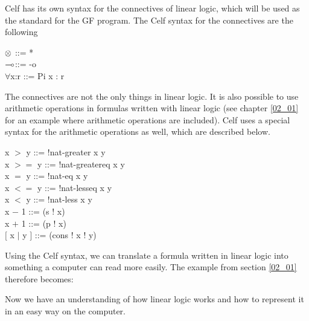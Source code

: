 Celf has its own syntax for the connectives of linear logic, which will be used as the standard for the GF program. The Celf syntax for the connectives are the following
\begin{texto}
	$\otimes$\hspace{40pt} ::= * \\
	$\multimap$\hspace{40pt}::= -o \\
	$\forall$x:r\hspace{30pt} ::= Pi x : r \\
\end{texto}
The connectives are not the only things in linear logic. It is also possible to use arithmetic operations in formulas written with linear logic (see chapter \ref{02_01} for an example where arithmetic operations are included). Celf uses a special syntax for the arithmetic operations as well, which are described below.
\begin{texto}
	x $>$ y\hspace{22.8pt} ::= !nat-greater x y \\
	x $>=$ y\hspace{15pt} ::= !nat-greatereq x y \\
	x $=$ y\hspace{22.8pt} ::= !nat-eq x y \\
	x $<=$ y\hspace{15pt} ::= !nat-lesseq x y \\
	x $<$ y\hspace{22.8pt} ::= !nat-less x y \\
 	x $-$ 1\hspace{22.8pt} ::= (s ! x) \\
 	x $+$ 1\hspace{22.8pt} ::= (p ! x) \\
	$\lbrack$ x $|$ y $\rbrack$ \hspace{12pt} ::= (cons ! x ! y)
\end{texto}
Using the Celf syntax, we can translate a formula written in linear logic into something a computer can read more easily. The example from section \ref{02_01} therefore becomes:
\begin{textoform}
\end{textoform}

Now we have an understanding of how linear logic works and how to represent it in an easy way on the computer. \\
 \\
